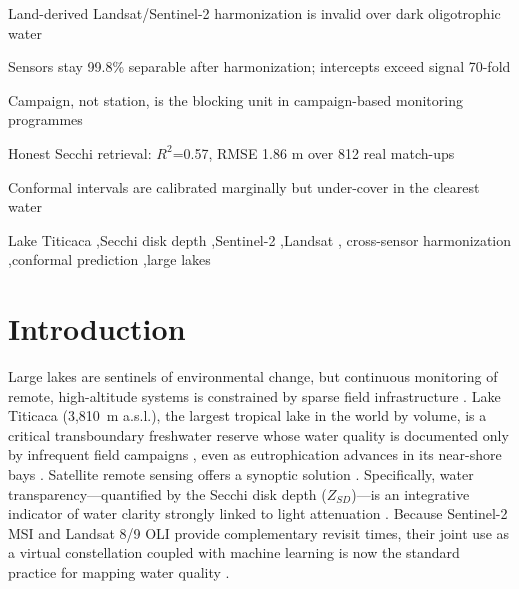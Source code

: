 \documentclass[final,5p,times,twocolumn,authoryear]{elsarticle}
\begin{document}
\begin{frontmatter}
\begin{highlights}
\item Land-derived Landsat/Sentinel-2 harmonization is invalid over dark
oligotrophic water
\item Sensors stay 99.8\% separable after harmonization; intercepts exceed
signal 70-fold
\item Campaign, not station, is the blocking unit in campaign-based
monitoring programmes
\item Honest Secchi retrieval: $R^2$=0.57, RMSE 1.86 m over 812 real
match-ups
\item Conformal intervals are calibrated marginally but under-cover in the
clearest water
\end{highlights}

\begin{keyword}
Lake Titicaca \sep Secchi disk depth \sep Sentinel-2 \sep Landsat \sep
cross-sensor harmonization \sep conformal prediction \sep large lakes
\end{keyword}

\end{frontmatter}

\section{Introduction}\label{sec:intro}

Large lakes are sentinels of environmental change, but continuous monitoring of remote, high-altitude systems is constrained by sparse field infrastructure \citep{Williamson2009}. Lake Titicaca (3,810~m a.s.l.), the largest tropical lake in the world by volume, is a critical transboundary freshwater reserve whose water quality is documented only by infrequent field campaigns \citep{OEFA2016,Siguayro2022eval}, even as eutrophication advances in its near-shore bays \citep{Heredia2022,Lanza2024}. Satellite remote sensing offers a synoptic solution \citep{Gholizadeh2016,Topp2020}. Specifically, water transparency---quantified by the Secchi disk depth ($Z_{SD}$)---is an integrative indicator of water clarity strongly linked to light attenuation \citep{Lee2015}. Because Sentinel-2 MSI and Landsat 8/9 OLI provide complementary revisit times, their joint use as a virtual constellation coupled with machine learning is now the standard practice for mapping water quality \citep{Pahlevan2020, Cao2022}.
\end{document}
